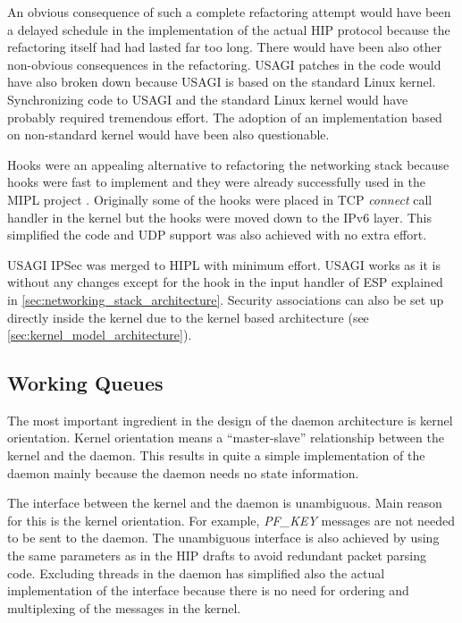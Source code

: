 An obvious consequence of such a complete refactoring attempt would
have been a delayed schedule in the implementation of the actual HIP
protocol because the refactoring itself had had lasted far too
long. There would have been also other non-obvious consequences in the
refactoring. USAGI patches in the code would have also broken down
because USAGI is based on the standard Linux kernel. Synchronizing
code to USAGI and the standard Linux kernel would have probably
required tremendous effort. The adoption of an implementation based on
non-standard kernel would have been also questionable.

Hooks were an appealing alternative to refactoring the networking
stack because hooks were fast to implement and they were already
successfully used in the MIPL project \cite{mipl}. Originally some of
the hooks were placed in TCP \textit{connect} call handler in the
kernel but the hooks were moved down to the IPv6 layer. This
simplified the code and UDP support was also achieved with no extra
effort.

USAGI IPSec was merged to HIPL with minimum effort. USAGI works as it
is without any changes except for the hook in the input handler of ESP
explained in \autoref{sec:networking_stack_architecture}. Security
associations can also be set up directly inside the kernel due to the
kernel based architecture (see
\autoref{sec:kernel_model_architecture}).

\subsection{Working Queues}
\label{sec:working_queue_lessons}

The most important ingredient in the design of the daemon architecture
is kernel orientation. Kernel orientation means a ``master-slave''
relationship between the kernel and the daemon. This results in quite
a simple implementation of the daemon mainly because the daemon needs
no state information.

The interface between the kernel and the daemon is unambiguous. Main
reason for this is the kernel orientation. For example,
\textit{PF\_KEY} \cite{rfc2367} messages are not needed to be sent to
the daemon. The unambiguous interface is also achieved by using the
same parameters as in the HIP drafts to avoid redundant packet parsing
code. Excluding threads in the daemon has simplified also the actual
implementation of the interface because there is no need for ordering
and multiplexing of the messages in the kernel.


